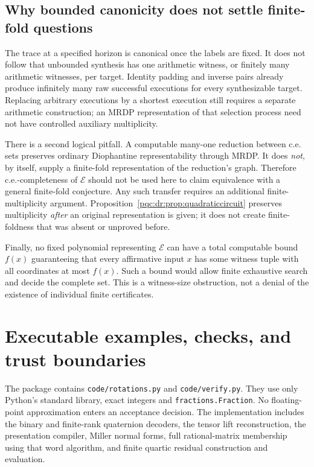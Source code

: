 \documentclass[11pt,letterpaper]{article}
\numberwithin{equation}{section}
\theoremstyle{definition}
\theoremstyle{remark}
\newcommand{\code}[1]{\nolinkurl{#1}}
\newcommand{\srcmark}[1]{\par\noindent{\small\itshape [source~#1]}\par}
\begin{document}
\subsection{Why bounded canonicity does not settle finite-fold questions}
The trace at a specified horizon is canonical once the labels are fixed.
It does not follow that unbounded synthesis has one arithmetic witness,
or finitely many arithmetic witnesses, per target. Identity padding and
inverse pairs already produce infinitely many raw successful executions
for every synthesizable target. Replacing arbitrary executions by a
shortest execution still requires a separate arithmetic construction;
an MRDP representation of that selection process need not have controlled
auxiliary multiplicity.

There is a second logical pitfall. A computable many-one reduction
between c.e. sets preserves ordinary Diophantine representability through
MRDP. It does \emph{not}, by itself, supply a finite-fold representation
of the reduction's graph. Therefore c.e.-completeness of $\mathcal E$
should not be used here to claim equivalence with a general finite-fold
conjecture. Any such transfer requires an additional finite-multiplicity
argument. Proposition~\ref{pqc:dr:prop:quadraticcircuit} preserves multiplicity
\emph{after} an original representation is given; it does not create
finite-foldness that was absent or unproved before.

Finally, no fixed polynomial representing $\mathcal E$ can have a total
computable bound $f(x)$ guaranteeing that every affirmative input $x$
has some witness tuple with all coordinates at most $f(x)$. Such a
bound would allow finite exhaustive search and decide the complete set.
This is a witness-size obstruction, not a denial of the existence of
individual finite certificates.

\section{Executable examples, checks, and trust boundaries}
\label{pqc:rr:sec:implementation}
\srcmark{11}

The package contains \code{code/rotations.py} and \code{code/verify.py}.
They use only Python's standard library, exact integers and
\code{fractions.Fraction}. No floating-point approximation enters an
acceptance decision. The implementation includes the binary and
finite-rank quaternion decoders, the tensor lift reconstruction, the
presentation compiler, Miller normal forms, full rational-matrix
membership using that word algorithm, and finite quartic residual
construction and evaluation.
\end{document}
